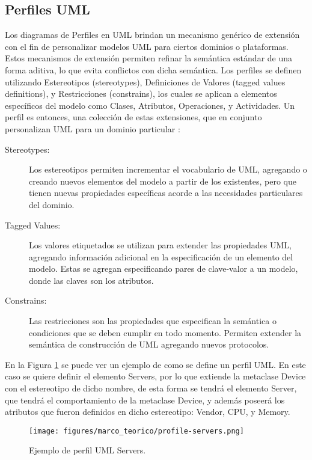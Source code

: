 \subsection{Perfiles UML}
Los diagramas de Perfiles en UML brindan un mecanismo genérico de extensión con el fin de personalizar modelos UML para ciertos dominios o plataformas. Estos mecanismos de extensión permiten refinar la semántica estándar de una forma aditiva, lo que evita conflictos con dicha semántica. Los perfiles se definen utilizando Estereotipos (stereotypes), Definiciones de Valores (tagged values definitions), y Restricciones (constrains), los cuales se aplican a elementos específicos del modelo como Clases, Atributos, Operaciones, y Actividades. Un perfil es entonces, una colección de estas extensiones, que en conjunto personalizan UML para un dominio particular \cite{visualparadigm}:
\begin{description}
\item[Stereotypes:]
Los estereotipos permiten incrementar el vocabulario de UML, agregando o creando nuevos elementos del modelo a partir de los existentes, pero que tienen nuevas propiedades específicas acorde a las necesidades particulares del dominio. 

\item[Tagged Values:]
Los valores etiquetados se utilizan para extender las propiedades UML, agregando información adicional en la especificación de un elemento del modelo. Estas se agregan especificando pares de clave-valor a un modelo, donde las claves son los atributos.

\item[Constrains:]
Las restricciones son las propiedades que especifican la semántica o condiciones que se deben cumplir en todo momento. Permiten extender la semántica de construcción de UML agregando nuevos protocolos.
\end{description}

En la Figura \ref{fig:marco:profile_server} se puede ver un ejemplo de como se define un perfil UML.
En este caso se quiere definir el elemento Servers, por lo que extiende la metaclase Device con el estereotipo de dicho nombre, de esta forma se tendrá el elemento Server, que tendrá el comportamiento de la metaclase Device, y además poseerá los atributos que fueron definidos en dicho estereotipo: Vendor, CPU, y Memory.

\begin{figure}[htbp]
    \centering
    \texttt{[image: figures/marco\_teorico/profile-servers.png]}
    \caption{Ejemplo de perfil UML Servers. \cite{umlprofile}}
    \label{fig:marco:profile_server}
\end{figure}

